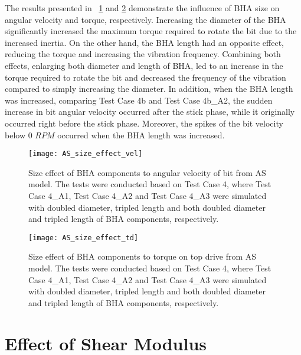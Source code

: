 The results presented in \figurename~\ref{figure_AS_BHA_size_effect_vel} and \ref{figure_AS_BHA_size_effect_td} demonstrate the influence of BHA size on angular velocity and torque, respectively. Increasing the diameter of the BHA significantly increased the maximum torque required to rotate the bit due to the increased inertia. On the other hand, the BHA length had an opposite effect, reducing the torque and increasing the vibration frequency. Combining both effects, enlarging both diameter and length of BHA, led to an increase in the torque required to rotate the bit and decreased the frequency of the vibration compared to simply increasing the diameter. In addition, when the BHA length was increased, comparing Test Case 4b and Test Case 4b\_A2, the sudden increase in bit angular velocity occurred after the stick phase, while it originally occurred right before the stick phase. Moreover, the spikes of the bit velocity below 0 $RPM$ occurred when the BHA length was increased.
\begin{figure}
  \centering
  \texttt{[image: AS\_size\_effect\_vel]}
  \caption[Size effect of BHA components to angular velocity from AS model]{Size effect of BHA components to angular velocity of bit from AS model. The tests were conducted based on Test Case 4, where Test Case 4\_A1, Test Case 4\_A2 and Test Case 4\_A3 were simulated with doubled diameter, tripled length and both doubled diameter and tripled length of BHA components, respectively.}\label{figure_AS_BHA_size_effect_vel}
\end{figure}

\begin{figure}
  \centering
  \texttt{[image: AS\_size\_effect\_td]}
  \caption[Size effect of BHA components to a torque from AS model]{Size effect of BHA components to torque on top drive from AS model. The tests were conducted based on Test Case 4, where Test Case 4\_A1, Test Case 4\_A2 and Test Case 4\_A3 were simulated with doubled diameter, tripled length and both doubled diameter and tripled length of BHA components, respectively.}\label{figure_AS_BHA_size_effect_td}
\end{figure}

\section{Effect of Shear Modulus}